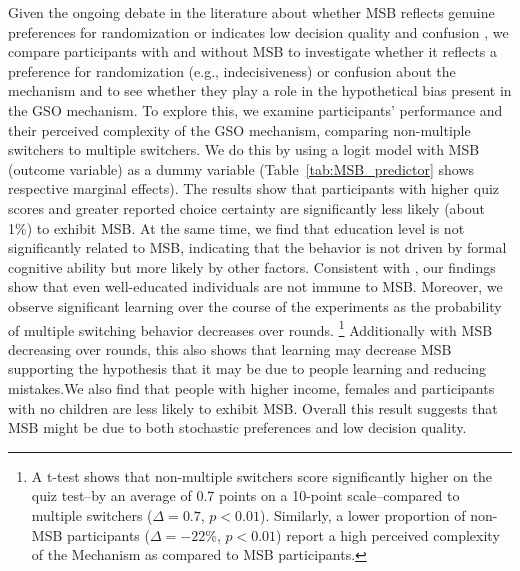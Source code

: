 \documentclass[12pt]{article}
\begin{document}
Given the ongoing debate in the literature about whether MSB reflects genuine preferences for randomization \citep{agranov2017stochastic} or indicates low decision quality and confusion \citep{charness2013experimental, yu2021multiple, filippin2016reconsideration}, we compare participants with and without MSB to investigate whether it reflects a preference for randomization (e.g., indecisiveness) or confusion about the mechanism and to see whether they play a role in the hypothetical bias present in the GSO mechanism. To explore this, we examine participants' performance and their perceived complexity of the GSO mechanism, comparing non-multiple switchers to multiple switchers. We do this by using a logit model with MSB (outcome variable) as a dummy variable (Table~\ref{tab:MSB_predictor} shows respective marginal effects). The results show that participants with higher quiz scores and greater reported choice certainty are significantly less likely (about 1\%) to exhibit MSB. At the same time, we find that education level is not significantly related to MSB, indicating that the behavior is not driven by formal cognitive ability but more likely by other factors. Consistent with \citet{yu2021multiple}, our findings show that even well-educated individuals are not immune to MSB. Moreover, we observe significant learning over the course of the experiments as the probability of multiple switching behavior decreases over rounds.%
\footnote{A t-test shows that non-multiple switchers score significantly higher on the quiz test--by an average of 0.7 points on a 10-point scale--compared to multiple switchers (\(\Delta = 0.7\), \(p < 0.01\)). Similarly, a lower proportion of non-MSB participants (\(\Delta = -22\%\), \(p < 0.01\)) report a high perceived complexity of the Mechanism as compared to MSB participants.} Additionally with MSB decreasing over rounds, this also shows that learning may decrease MSB supporting the hypothesis that it may be due to people learning and reducing mistakes.We also find that people with higher income, females and participants with no children are less likely to exhibit MSB. Overall this result suggests that MSB might be due to both stochastic preferences and low decision quality.
\end{document}
